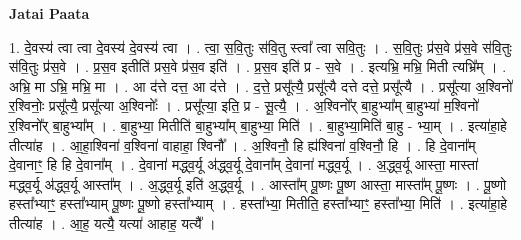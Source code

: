\documentclass[17pt]{extarticle}
\begin{document}
\textbf{Jatai Paata} \newline

1. दे॒वस्य॑ त्वा त्वा दे॒वस्य॑ दे॒वस्य॑ त्वा । . त्वा॒ स॒वि॒तुः स॑वि॒तु स्त्वा᳚ त्वा सवि॒तुः । . स॒वि॒तुः प्र॑स॒वे प्र॑स॒वे स॑वि॒तुः स॑वि॒तुः प्र॑स॒वे । . प्र॒स॒व इतीति॑ प्रस॒वे प्र॑स॒व इति॑ । . प्र॒स॒व इति॑ प्र - स॒वे । . इत्यभ्रि॒ मभ्रि॒ मिती त्यभ्रि᳚म् । . अभ्रि॒ मा ऽभ्रि॒ मभ्रि॒ मा । . आ द॑त्ते दत्त॒ आ द॑त्ते । . द॒त्ते॒ प्रसू᳚त्यै॒ प्रसू᳚त्यै दत्ते दत्ते॒ प्रसू᳚त्यै । . प्रसू᳚त्या अ॒श्विनो॑ र॒श्विनोः॒ प्रसू᳚त्यै॒ प्रसू᳚त्या अ॒श्विनोः᳚ । . प्रसू᳚त्या॒ इति॒ प्र - सू॒त्यै॒ । . अ॒श्विनो᳚र् बा॒हुभ्या᳚म् बा॒हुभ्या॑ म॒श्विनो॑ र॒श्विनो᳚र् बा॒हुभ्या᳚म् । . बा॒हुभ्या॒ मितीति॑ बा॒हुभ्या᳚म् बा॒हुभ्या॒ मिति॑ । . बा॒हुभ्या॒मिति॑ बा॒हु - भ्या॒म् । . इत्या॑हा॒हे तीत्या॑ह । . आ॒हा॒श्विना॑ व॒श्विना॑ वाहाहा॒ श्विनौ᳚ । . अ॒श्विनौ॒ हि ह्य॑श्विना॑ व॒श्विनौ॒ हि । . हि दे॒वाना᳚म् दे॒वानाꣳ॒॒ हि हि दे॒वाना᳚म् । . दे॒वाना॑ मद्ध्व॒र्यू अ॑द्ध्व॒र्यू दे॒वाना᳚म् दे॒वाना॑ मद्ध्व॒र्यू । . अ॒द्ध्व॒र्यू आस्ता॒ मास्ता॑ मद्ध्व॒र्यू अ॑द्ध्व॒र्यू आस्ता᳚म् । . अ॒द्ध्व॒र्यू इति॑ अ॒द्ध्व॒र्यू । . आस्ता᳚म् पू॒ष्णः पू॒ष्ण आस्ता॒ मास्ता᳚म् पू॒ष्णः । . पू॒ष्णो हस्ता᳚भ्याꣳ॒॒ हस्ता᳚भ्याम् पू॒ष्णः पू॒ष्णो हस्ता᳚भ्याम् । . हस्ता᳚भ्या॒ मितीति॒ हस्ता᳚भ्याꣳ॒॒ हस्ता᳚भ्या॒ मिति॑ । . इत्या॑हा॒हे तीत्या॑ह । . आ॒ह॒ यत्यै॒ यत्या॑ आहाह॒ यत्यै᳚ । \newline
\end{document}
